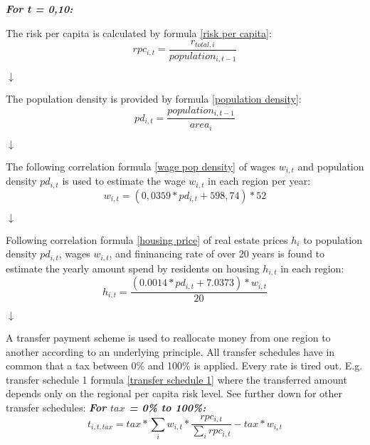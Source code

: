 \documentclass[10pt,a4]{article}
\begin{document}
\begin{center}
\textbf{\textit{For t = 0,10:}}\vspace{.5cm}

The risk per capita is calculated by formula \ref{risk per capita}:
\begin{equation}
    rpc_{i,t} = \frac{r_{total,i}}{population_{i,t-1}} 
    \label{risk per capita}
\end{equation}

\begin{center}
    $\downarrow$
\end{center}
The population density is provided by formula \ref{population density}:
\begin{equation}
    pd_{i,t} = \frac{population_{i,t-1}}{area_i}
    \label{population density}
\end{equation}

\begin{center}
    $\downarrow$
\end{center}
The following correlation formula \ref{wage pop density} of wages $w_{i,t}$ and population density $pd_{i,t}$ is used to estimate the wage $w_{i,t}$ in each region per year:
\begin{equation}
    w_{i,t} = (0,0359*pd_{i,t}+598,74) * 52
    \label{wage pop density}
\end{equation}

\begin{center}
    $\downarrow$
\end{center}
Following correlation formula \ref{housing price} of real estate prices $h_i$ to population density $pd_{i,t}$, wages $w_{i,t}$, and fininancing rate of over 20 years is found to estimate the yearly amount spend by residents on housing $h_{i,t}$ in each region:
\begin{equation}
    h_{i,t} = \frac{(0.0014*pd_{i,t}+7.0373) * w_{i,t}}{20}
    \label{housing price}
\end{equation}

\begin{center}
    $\downarrow$
\end{center}
A transfer payment scheme is used to reallocate money from one region to another according to an underlying principle. All transfer schedules have in common that a tax between 0\% and 100\% is applied. Every rate is tired out. E.g. transfer schedule 1 formula \ref{transfer schedule 1} where the transferred amount depends only on the regional per capita risk level. See further down for other transfer schedules:
\newline
\newline
\textbf{\textit{For $tax$ = 0\% to 100\%:}}
\begin{equation}
    t_{i,t,tax} = tax * \sum_i w_{i,t} * \frac{rpc_{i,t}}{\sum_i rpc_{i,t}} - tax * w_{i,t}
    \label{transfer schedule 1}
\end{equation}


\end{center}
\end{document}
